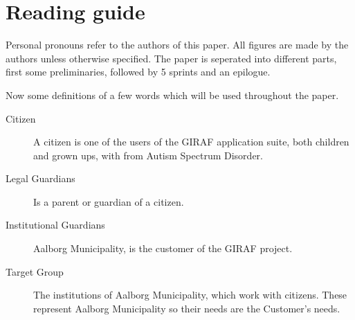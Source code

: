 \section*{Reading guide}

Personal pronouns refer to the authors of this paper. 
All figures are made by the authors unless otherwise specified.
The paper is seperated into different parts, first some preliminaries, followed by 5 sprints and an epilogue.

Now some definitions of a few words which will be used throughout the paper.

\begin{description}
	\item[Citizen] A citizen is one of the users of the GIRAF application suite, both children and grown ups, with from Autism Spectrum Disorder.
	\item[Legal Guardians] Is a parent or guardian of a citizen.
	\item[Institutional Guardians} Is one of the employees working at one of the institution which might use the GIRAF application suite.
	\item[Customer] Aalborg Municipality, is the customer of the GIRAF project.
	\item[Target Group] The institutions of Aalborg Municipality, which work with citizens. These represent Aalborg Municipality so their needs are the Customer's needs.
\end{description}


\newpage
